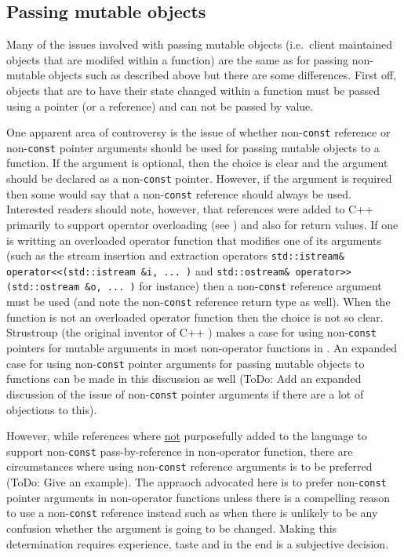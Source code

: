 %
\subsection{Passing mutable objects}
%

Many of the issues involved with passing mutable objects (i.e.~client
maintained objects that are modifed within a function) are the same as
for passing non-mutable objects such as described above but there are
some differences.  First off, objects that are to have their state
changed within a function must be passed using a pointer (or a
reference) and can not be passed by value.

One apparent area of controversy is the issue of whether
non-\texttt{const} reference or non-\texttt{const} pointer arguments
should be used for passing mutable objects to a function.  If the
argument is optional, then the choice is clear and the argument should
be declared as a non-\texttt{const} pointer.  However, if the argument
is required then some would say that a non-\texttt{const} reference
should always be used.  Interested readers should note, however, that
references were added to C++ primarily to support operator overloading
(see {}\cite[Section 3.7]{ref:design_evol_cpp}) and also for return
values.  If one is writting an overloaded operator function that
modifies one of its arguments (such as the stream insertion and
extraction operators {}\texttt{std::istream\& operator<<(std::istream
\&i, ... )} and {}\texttt{std::ostream\& operator>>(std::ostream \&o,
... )} for instance) then a non-\texttt{const} reference argument must
be used (and note the non-\texttt{const} reference return type as
well).  When the function is not an overloaded operator function then
the choice is not so clear.  Strustroup (the original inventor of C++
{}\cite{ref:design_evol_cpp}) makes a case for using
non-\texttt{const} pointers for mutable arguments in most non-operator
functions in {}\cite[Section 5.5]{ref:stroustrup_2000}.  An expanded
case for using non-\texttt{const} pointer arguments for passing
mutable objects to functions can be made in this discussion as well
(ToDo: Add an expanded discussion of the issue of non-\texttt{const}
pointer arguments if there are a lot of objections to this).

However, while references where {}\underline{not} purposefully added
to the language to support non-\texttt{const} pass-by-reference in
non-operator function, there are circumstances where using
non-\texttt{const} reference arguments is to be preferred (ToDo: Give
an example).  The appraoch advocated here is to prefer
non-\texttt{const} pointer arguments in non-operator functions unless
there is a compelling reason to use a non-\texttt{const} reference
instead such as when there is unlikely to be any confusion whether the
argument is going to be changed.  Making this determination requires
experience, taste and in the end is a subjective decision.

